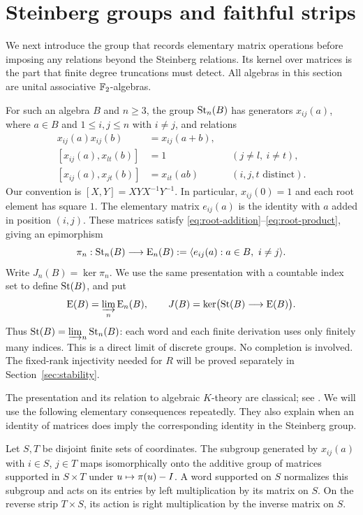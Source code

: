 \section{Steinberg groups and faithful strips}\label{sec:steinberg}

We next introduce the group that records elementary matrix operations
before imposing any relations beyond the Steinberg relations. Its kernel
over matrices is the part that finite degree truncations must detect.
All algebras in this section are unital associative $\mathbb F_2$-algebras.

For such an algebra $B$ and $n\ge3$, the group $\operatorname{St}_n(B)$ has generators
$x_{ij}(a)$, where $a\in B$ and $1\le i,j\le n$ with $i\ne j$, and
relations
\begin{align}
 x_{ij}(a)x_{ij}(b)&=x_{ij}(a+b),\label{eq:root-addition}\\
 [x_{ij}(a),x_{lt}(b)]&=1
       &&(j\ne l,\ i\ne t),\label{eq:root-commuting}\\
 [x_{ij}(a),x_{jt}(b)]&=x_{it}(ab)
       &&(i,j,t\text{ distinct}).\label{eq:root-product}
\end{align}
Our convention is $[X,Y]=XYX^{-1}Y^{-1}$.
In particular, $x_{ij}(0)=1$ and each root element has square $1$.
The elementary matrix $e_{ij}(a)$ is the identity with $a$ added in
position $(i,j)$. These matrices satisfy
\eqref{eq:root-addition}--\eqref{eq:root-product}, giving an epimorphism
\[
 \pi_n:\operatorname{St}_n(B)\longrightarrow\operatorname{E}_n(B)
       :=\langle e_{ij}(a):a\in B,\ i\ne j\rangle.
\]
Write $J_n(B)=\ker\pi_n$. We use the same presentation with a countable
index set to define $\operatorname{St}(B)$, and put
\[
 \operatorname{E}(B)=\varinjlim_n\operatorname{E}_n(B),\qquad
 J(B)=\ker\bigl(\operatorname{St}(B)\longrightarrow\operatorname{E}(B)\bigr).
\]
Thus $\operatorname{St}(B)=\varinjlim_n\operatorname{St}_n(B)$: each word and each finite derivation
uses only finitely many indices. This is a direct limit of discrete
groups. No completion is involved. The fixed-rank injectivity needed for
$R$ will be proved separately in Section~\ref{sec:stability}.

The presentation and its relation to algebraic $K$-theory are classical;
see \cite{Milnor,WeibelK}. We will use the following elementary
consequences repeatedly. They also explain when an identity of matrices
does imply the corresponding identity in the Steinberg group.

\begin{lemma}\label{lem:strip}
Let $S,T$ be disjoint finite sets of coordinates. The subgroup generated
by $x_{ij}(a)$ with $i\in S$, $j\in T$ maps isomorphically onto the
additive group of matrices supported in $S\times T$ under $u\mapsto
\pi(u)-I$. A word supported on $S$ normalizes this subgroup and acts
on its entries by left multiplication by its matrix on $S$.
On the reverse strip $T\times S$, its action is right multiplication
by the inverse matrix on $S$.
\end{lemma}

